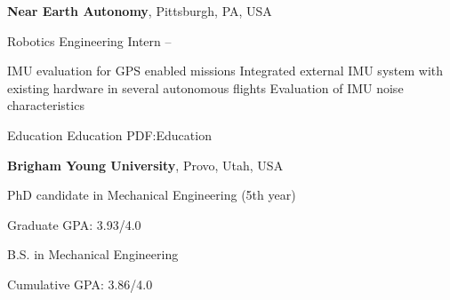 \documentclass[letterpaper,MMMyyyy,nonstopmode]{simpleresumecv}
\begin{document}
\begin{Body}
\Gap
\Entry
\textbf{Near Earth Autonomy},
Pittsburgh, PA, USA

\Gap
\BulletItem
Robotics Engineering Intern
\hfill
{} --
\begin{Detail}
\SubBulletItem
IMU evaluation for GPS enabled missions
\SubBulletItem
Integrated external IMU system with existing hardware in several autonomous flights
\SubBulletItem
Evaluation of IMU noise characteristics
\end{Detail}





\Section
{Education}
{Education}
{PDF:Education}

\Entry
{\textbf{Brigham Young University}},
Provo, Utah, USA

\Gap
\BulletItem
PhD candidate in Mechanical Engineering (5th year)
\hfill
\begin{Detail}
\SubBulletItem
Graduate GPA: 3.93/4.0
\end{Detail}

\BulletItem
B.S. in Mechanical Engineering
\hfill
\begin{Detail}
\SubBulletItem
Cumulative GPA: 3.86/4.0
\end{Detail}


\end{Body}
\end{document}
